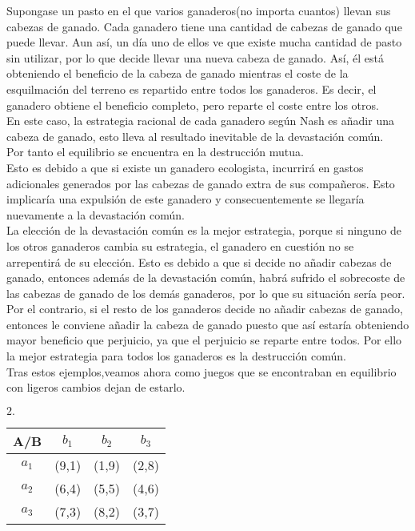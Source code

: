\documentclass[10pt,a4paper]{book}
\begin{document}
Supongase un pasto en el que varios ganaderos(no importa cuantos) llevan sus cabezas de ganado. Cada ganadero tiene una cantidad de cabezas de ganado que puede llevar. Aun así, un día uno de ellos ve que existe mucha cantidad de pasto sin utilizar, por lo que decide llevar una nueva cabeza de ganado. Así, él está obteniendo el beneficio de la cabeza de ganado mientras el coste de la esquilmación del terreno es repartido entre todos los ganaderos. Es decir, el ganadero obtiene el beneficio completo, pero reparte el coste entre los otros.\\
En este caso, la estrategia racional de cada ganadero según Nash es añadir una cabeza de ganado, esto lleva al resultado inevitable de la devastación común.\\
Por tanto el equilibrio se encuentra en la destrucción mutua.\\
Esto es debido a que si existe un ganadero ecologista, incurrirá en gastos adicionales generados por las cabezas de ganado extra de sus compañeros. Esto implicaría una expulsión de este ganadero y consecuentemente se llegaría nuevamente a la devastación común.\\

La elección de la devastación común es la mejor estrategia, porque si ninguno de los otros ganaderos cambia su estrategia, el ganadero en cuestión no se arrepentirá de su elección. Esto es debido a que si decide no añadir cabezas de ganado, entonces además de la devastación común, habrá sufrido el sobrecoste de las cabezas de ganado de los demás ganaderos, por lo que su situación sería peor. Por el contrario, si el resto de los ganaderos decide no añadir cabezas de ganado, entonces le conviene añadir la cabeza de ganado puesto que así estaría obteniendo mayor beneficio que perjuicio, ya que el perjuicio se reparte entre todos. Por ello la mejor estrategia para todos los ganaderos es la destrucción común.\\



Tras estos ejemplos,veamos ahora como juegos que se encontraban en equilibrio con ligeros cambios dejan de estarlo.\\


\begin{center}
		$2. \quad$
	\begin{tabular}{|c|c|c|c|}
		\hline
		A/B & $b_1$ & $b_2$ & $b_3$ \\
		\hline
		$a_1$ & (9,1) & (1,9) & (2,8)\\
		$a_2$ & (6,4) & (5,5) & (4,6) \\
		$a_3$ & (7,3) & (8,2) &(3,7) \\
		\hline
	\end{tabular}
\end{center}
\end{document}
